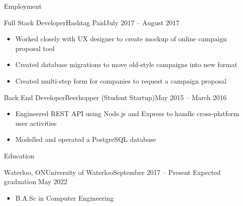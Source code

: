 \documentclass[]{mcdowellcv}
\begin{document}
    \makeheader

    \begin{cvsection}{Employment}
        \begin{cvsubsection}{Full Stack Developer}{Hashtag Paid}{July 2017 -- August 2017}
            \begin{itemize}
                \item Worked closely with UX designer to create mockup of online campaign proposal tool
                \item Created database migrations to move old-style campaigns into new format
                \item Created multi-step form for companies to request a campaign proposal
            \end{itemize}
        \end{cvsubsection}

        \begin{cvsubsection}{Back End Developer}{Beerhopper (Student Startup)}{May 2015 -- March 2016}
            \begin{itemize}
                \item Engineered REST API using Node.js and Express to handle cross-platform user activities
                \item Modelled and operated a PostgreSQL database
            \end{itemize}
        \end{cvsubsection}
    \end{cvsection}

    \begin{cvsection}{Education}
        \begin{cvsubsection}{Waterloo, ON}{University of Waterloo}{September 2017 -- Present}
            Expected graduation May 2022
            \begin{itemize}
                \item B.A.Sc in Computer Engineering
            \end{itemize}
        \end{cvsubsection}
    \end{cvsection}
\end{document}
